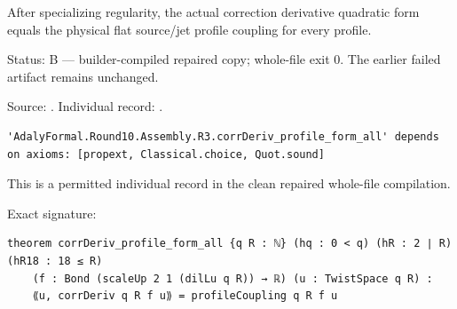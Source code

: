 \begin{theorem}
\label{join-4}
\leanok
After specializing regularity, the actual correction derivative quadratic form equals the physical flat source/jet profile coupling for every profile.
\par Status: B — builder-compiled repaired copy; whole-file exit 0. The earlier failed artifact remains unchanged.
\par Source: \texttt{}. Individual record: \texttt{}.
\begin{verbatim}
'AdalyFormal.Round10.Assembly.R3.corrDeriv_profile_form_all' depends on axioms: [propext, Classical.choice, Quot.sound]
\end{verbatim}
This is a permitted individual record in the clean repaired whole-file compilation.
\par Exact signature:
\begin{verbatim}
theorem corrDeriv_profile_form_all {q R : ℕ} (hq : 0 < q) (hR : 2 ∣ R) (hR18 : 18 ≤ R)
    (f : Bond (scaleUp 2 1 (dilLu q R)) → ℝ) (u : TwistSpace q R) :
    ⟪u, corrDeriv q R f u⟫ = profileCoupling q R f u
\end{verbatim}
\end{theorem}


